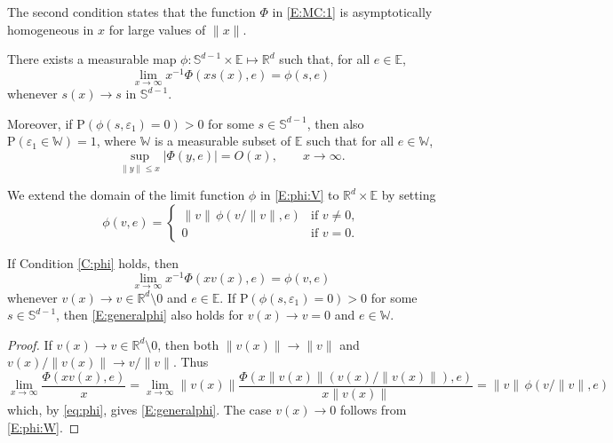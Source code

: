 \documentclass{aptpubarxiv}
\numberwithin{equation}{section}
\begin{document}
The second condition states that the function $\Phi$ in \eqref{E:MC:1} is asymptotically homogeneous in $x$ for large values of $\|x\|$.
\begin{cond}
\label{C:phi} 
There exists a measurable map $\phi: \mathbb{S}^{d-1} \times \mathbb{E} \mapsto \mathbb{R}^d$ such that, for all $e \in \mathbb{E}$,
\begin{equation}
\label{E:phi:V}
	\lim_{x \to \infty} x^{-1} \Phi(x s(x), e) = \phi(s,e)
\end{equation}
whenever $s(x) \to s$ in $\mathbb{S}^{d-1}$.

Moreover, if ${\mathrm{P}}(\phi(s, {\varepsilon}_1) = 0) > 0$ for some $s \in \mathbb{S}^{d-1}$, then also ${\mathrm{P}}({\varepsilon}_1 \in {\mathbb{W}}) = 1$, where ${\mathbb{W}}$ is a measurable subset of ${\mathbb{E}}$ such that for all $e \in {\mathbb{W}}$,
\begin{equation}
\label{E:phi:W}
	\sup_{\|y\| \leq x} |\Phi(y, e)| = O(x), \qquad x \to \infty.
\end{equation}
\end{cond}

We extend the domain of the limit function $\phi$ in \eqref{E:phi:V} to $\mathbb{R}^d \times \mathbb{E}$ by setting
\begin{equation}
\label{eq:phi}
  \phi(v, e) = 
  \begin{cases}
    \| v \| \, \phi( v / \| v \|, e ) & \text{if $v \ne 0$,} \\
    0 & \text{if $v = 0$.}
  \end{cases}
\end{equation}

\begin{lem}\label{L:generalphi}
If Condition \ref{C:phi} holds, then 
\begin{equation}
\label{E:generalphi}
  \lim_{x \to \infty} x^{-1} \Phi(x v(x), e) 
  = \phi(v,e)
\end{equation}
whenever $v(x) \to v \in \mathbb{R}^d \setminus{0}$ and $e \in \mathbb{E}$. If ${\mathrm{P}}(\phi(s, {\varepsilon}_1) = 0) > 0$ for some $s \in \mathbb{S}^{d-1}$, then \eqref{E:generalphi} also holds for $v(x) \to v = 0$ and $e \in {\mathbb{W}}$.
\end{lem}
\begin{proof} If $v(x) \to v \in \mathbb{R}^d \setminus{0}$, then both $\|v(x)\|\to \|v\|$ and $v(x)/\|v(x)\| \to v/\|v\|$.  Thus
\[
  \lim_{x \to \infty} \frac{\Phi(x v(x), e)}{x} 
  = \lim_{x \to \infty} \|v(x)\|\frac{\Phi(x \|v(x)\|(v(x)/\|v(x)\|), e)}{x\|v(x)\|}
  = \| v \| \, \phi( v / \| v \|, e )
\]
which, by \eqref{eq:phi}, gives \eqref{E:generalphi}. The case $v(x) \to 0$  follows from \eqref{E:phi:W}.
\end{proof}
\end{document}
